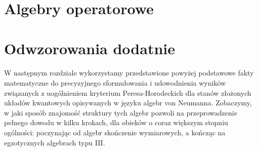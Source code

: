 















\section{Algebry operatorowe}


\section{Odwzorowania dodatnie}


\paragraph{}
W następnym rozdziale wykorzystamy przedstawione powyżej podstawowe fakty
matematyczne do precyzyjnego sformułowania i udowodnienia wyników związanych
z uogólnieniem kryterium Peresa-Horodeckich dla stanów złożonych układów
kwantowych opisywanych w języku algebr von Neumanna.
Zobaczymy,
w jaki sposób znajomość struktury tych algebr pozwoli na przeprowadzenie
pełnego dowodu w kilku krokach, dla obieków o coraz większym stopniu ogólności:
poczynając od algebr skończenie wymiarowych,
a kończąc na egzotycznych algebrach typu III.

